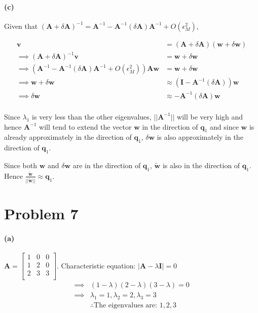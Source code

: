 \documentclass[12pt, letterpaper]{article}
\begin{document}
\paragraph{(c)}
Given that $(\mathbf{A} + \delta \mathbf{A})^{-1} = \mathbf{A}^{-1} - \mathbf{A}^{-1}(\delta \mathbf{A})\mathbf{A}^{-1} + O(\epsilon_M^2)$,

\begin{align*}
  \mathbf{v} &= (\mathbf{A} + \delta \mathbf{A})(\mathbf{w} + \delta \mathbf{w}) \\
  \implies (\mathbf{A} + \delta \mathbf{A})^{-1}\mathbf{v} &= \mathbf{w} + \delta \mathbf{w} \\
  \implies (\mathbf{A}^{-1} - \mathbf{A}^{-1}(\delta \mathbf{A})\mathbf{A}^{-1} + O(\epsilon_M^2))\mathbf{Aw}
  &= \mathbf{w} + \delta \mathbf{w}\\
  \implies \mathbf{w} + \delta \mathbf{w} &\approx
  (\mathbf{I} - \mathbf{A}^{-1}(\delta \mathbf{A}))\mathbf{w} \\
  \implies \delta \mathbf{w} &\approx - \mathbf{A}^{-1}(\delta \mathbf{A})\mathbf{w} \\
\end{align*}

Since $\lambda_1$ is very less than the other eigenvalues, $||\mathbf{A}^{-1}||$ will be very high and hence $\mathbf{A}^{-1}$ will tend to extend the vector $\mathbf{w}$ in the direction of $\mathbf{q}_1$ and since $\mathbf{w}$ is already approximately in the direction of $\mathbf{q}_1$, $\delta \mathbf{w}$ is also approximately in the direction of $\mathbf{q}_1$.

Since both $\mathbf{w}$ and $\delta\mathbf{w}$ are in the direction of $\mathbf{q}_1$, $\mathbf{\tilde{w}}$ is also in the direction of $\mathbf{q}_1$. Hence $\frac{\mathbf{\tilde{w}}}{||\mathbf{\tilde{w}}||} \approx \mathbf{q}_1$.

\pagebreak
\section*{Problem 7}

\paragraph{(a)} $\mathbf{A} =
\begin{bmatrix} 
  1 & 0 & 0 \\
  1 & 2 & 0 \\
  2 & 3 & 3 \\
\end{bmatrix}$. Characteristic equation: $|\mathbf{A} - \lambda \mathbf{I}| = 0$
\begin{align*}
  \implies &(1 - \lambda)(2 - \lambda)(3 - \lambda) = 0 \\
  \implies &\lambda_1 = 1, \lambda_2 = 2, \lambda_3 = 3 \\
  &\boxed{\therefore \text{The eigenvalues are: }1, 2, 3} \\
\end{align*}
\end{document}
